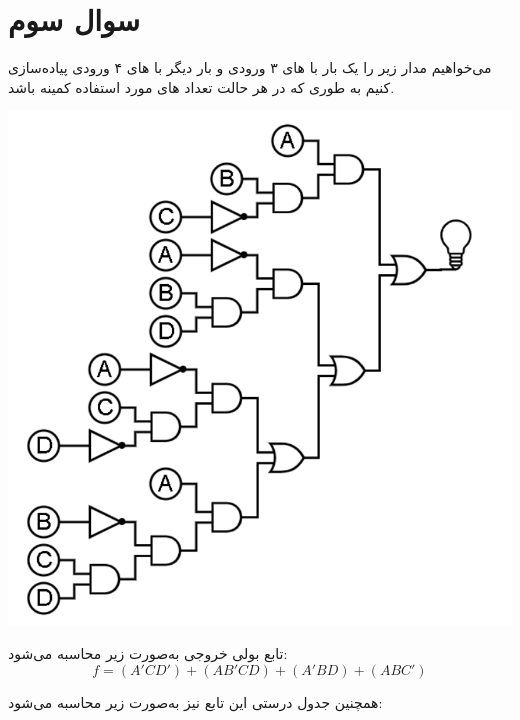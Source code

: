 \section{سوال سوم}
می‌خواهیم مدار زیر را یک بار با های ۳ ورودی و بار دیگر با های ۴ ورودی پیاده‌سازی کنیم به طوری که در هر حالت تعداد های مورد استفاده کمینه باشد.


\begin{center}
	\includegraphics*[width=0.6\linewidth]{pics/img1.png}
\end{center}



\begin{qsolve}
	تابع بولی خروجی به‌صورت زیر محاسبه می‌شود:
	$$ f=(A'CD') + (AB'CD) + (A'BD) + (ABC') $$
	
	همچنین جدول درستی این تابع نیز به‌صورت زیر محاسبه می‌شود:
\end{qsolve}


